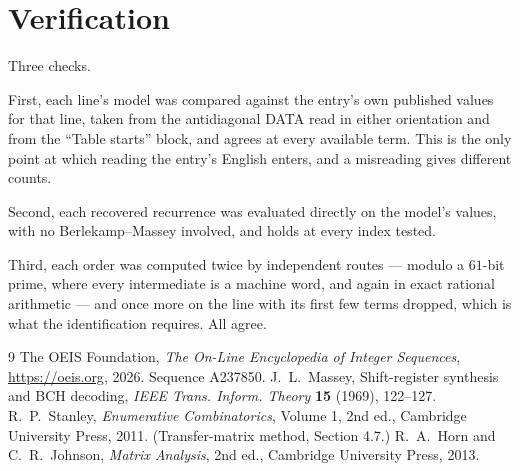 \documentclass[11pt,a4paper]{article}
\theoremstyle{plain}
\theoremstyle{definition}
\begin{document}
\section{Verification}

Three checks.

First, each line's model was compared against the entry's own published values for that line,
taken from the antidiagonal DATA read in either orientation and from the ``Table starts''
block, and agrees at every available term. This is the only point at which reading the entry's
English enters, and a misreading gives different counts.

Second, each recovered recurrence was evaluated directly on the model's values, with no
Berlekamp--Massey involved, and holds at every index tested.

Third, each order was computed twice by independent routes --- modulo a $61$-bit prime, where
every intermediate is a machine word, and again in exact rational arithmetic --- and once more
on the line with its first few terms dropped, which is what the identification requires. All
agree.

\begin{thebibliography}{9}
 The OEIS Foundation, \emph{The On-Line Encyclopedia of Integer
Sequences}, \url{https://oeis.org}, 2026. Sequence A237850.
 J.~L.~Massey, Shift-register synthesis and BCH decoding, \emph{IEEE
Trans. Inform. Theory} \textbf{15} (1969), 122--127.
 R.~P.~Stanley, \emph{Enumerative Combinatorics}, Volume 1, 2nd ed.,
Cambridge University Press, 2011. (Transfer-matrix method, Section 4.7.)
 R.~A.~Horn and C.~R.~Johnson, \emph{Matrix Analysis}, 2nd ed., Cambridge
University Press, 2013.
\end{thebibliography}
\end{document}
